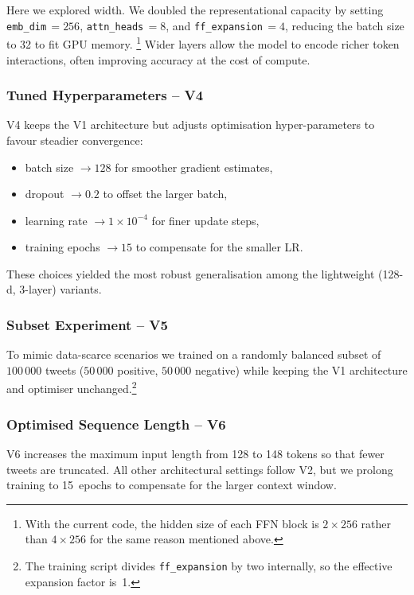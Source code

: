 \documentclass[twocolumn,superscriptaddress,aps]{revtex4-1}
\begin{document}
Here we explored width. We doubled the representational capacity by setting
\texttt{emb\_dim}\,$=256$, \texttt{attn\_heads}\,$=8$, and \texttt{ff\_expansion}\,$=4$,
reducing the batch size to 32 to fit GPU memory.
%
\footnote{With the current code, the hidden size of each FFN block is $2\times256$ rather than $4\times256$ for the same reason mentioned above.}
Wider layers allow the model to encode richer token interactions, often improving accuracy at the cost of compute.

\subsubsection{Tuned Hyperparameters -- V4}

V4 keeps the V1 architecture but adjusts optimisation hyper-parameters to favour steadier convergence:
\begin{itemize}
  \item batch size $\rightarrow 128$ for smoother gradient estimates,
  \item dropout $\rightarrow 0.2$ to offset the larger batch,
  \item learning rate $\rightarrow 1\times10^{-4}$ for finer update steps,
  \item training epochs $\rightarrow 15$ to compensate for the smaller LR.
\end{itemize}
These choices yielded the most robust generalisation among the lightweight (128-d, 3-layer) variants.

\subsubsection{Subset Experiment -- V5}

To mimic data-scarce scenarios we trained on a randomly balanced subset of $100\,000$ tweets
($50\,000$ positive, $50\,000$ negative) while keeping the V1 architecture and optimiser unchanged.\footnote{The
training script divides \texttt{ff\_expansion} by two internally, so the effective expansion factor is~1.}

\subsubsection{Optimised Sequence Length -- V6}

V6 increases the maximum input length from 128 to 148 tokens so that fewer tweets are truncated.
All other architectural settings follow V2, but we prolong training to 15~epochs to compensate for the
larger context window.
\end{document}
